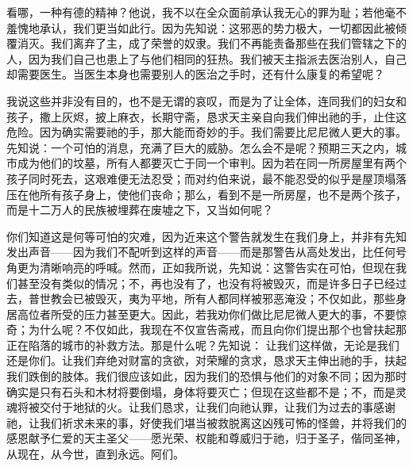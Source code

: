 \par

看哪，一种有德的精神？他说，我不以在全众面前承认我无心的罪为耻；若他毫不羞愧地承认，我们更当如此行。因为先知说：这邪恶的势力极大，一切都因此被倾覆消灭。我们离弃了主，成了荣誉的奴隶。我们不再能责备那些在我们管辖之下的人，因为我们自己也患上了与他们相同的狂热。我们被天主指派去医治别人，自己却需要医生。当医生本身也需要别人的医治之手时，还有什么康复的希望呢？\par

我说这些并非没有目的，也不是无谓的哀叹，而是为了让全体，连同我们的妇女和孩子，撒上灰烬，披上麻衣，长期守斋，恳求天主亲自向我们伸出祂的手，止住这危险。因为确实需要祂的手，那大能而奇妙的手。我们需要比尼尼微人更大的事。先知说：一个可怕的消息，充满了巨大的威胁。怎么会不是呢？预期三天之内，城市成为他们的坟墓，所有人都要灭亡于同一个审判。因为若在同一所房屋里有两个孩子同时死去，这艰难便无法忍受；而对约伯来说，最不能忍受的似乎是屋顶塌落压在他所有孩子身上，使他们丧命；那么，看到不是一所房屋，也不是两个孩子，而是十二万人的民族被埋葬在废墟之下，又当如何呢？\par

你们知道这是何等可怕的灾难，因为近来这个警告就发生在我们身上，并非有先知发出声音——因为我们不配听到这样的声音——而是那警告从高处发出，比任何号角更为清晰响亮的呼喊。然而，正如我所说，先知说：这警告实在可怕，但现在我们甚至没有类似的情况；不，再也没有了，也没有将被毁灭，而是许多日子已经过去，普世教会已被毁灭，夷为平地，所有人都同样被邪恶淹没；不仅如此，那些身居高位者所受的压力甚至更大。因此，若我劝你们做比尼尼微人更大的事，不要惊奇；为什么呢？不仅如此，我现在不仅宣告斋戒，而且向你们提出那个也曾扶起那正在陷落的城市的补救方法。那是什么呢？先知说： 让我们这样做，无论是我们还是你们。让我们弃绝对财富的贪欲，对荣耀的贪求，恳求天主伸出祂的手，扶起我们跌倒的肢体。我们很应该如此，因为我们的恐惧与他们的对象不同；因为那时确实是只有石头和木材将要倒塌，身体将要灭亡；但现在这些都不是；不，而是灵魂将被交付于地狱的火。让我们恳求，让我们向祂认罪，让我们为过去的事感谢祂，让我们祈求未来的事，好使我们堪当被救脱离这凶残可怖的怪兽，并将我们的感恩献予仁爱的天主圣父——愿光荣、权能和尊威归于祂，归于圣子，偕同圣神，从现在，从今世，直到永远。阿们。\par

